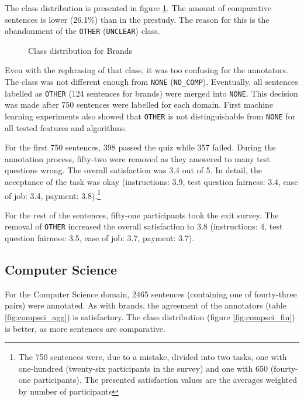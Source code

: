 The class distribution is presented in figure \ref{fig:brands_fin}. The amount of comparative sentences is lower (26.1\%) than in the prestudy. The reason for this is the abandonment of the \texttt{OTHER} (\texttt{UNCLEAR}) class. 

\begin{figure}[h]
\centering
\caption{Class distribution for Brands}
\label{fig:brands_fin}
\end{figure}



Even with the rephrasing of that class, it was too confusing for the annotators. The class was not different enough from \texttt{NONE} (\texttt{NO\_COMP}). Eventually, all sentences labelled as \texttt{OTHER} (124 sentences for brands) were merged into \texttt{NONE}. This decision was made after 750 sentences were labelled for each domain. First machine learning experiments also showed that \texttt{OTHER} is not distinguishable from \texttt{NONE} for all tested features and algorithms.

For the first 750 sentences, 398 passed the quiz while 357 failed. During the annotation process, fifty-two were removed as they answered to many test questions wrong. The overall satisfaction was 3.4 out of 5. In detail, the acceptance of the task was okay (instructions: 3.9, test question fairness: 3.4, ease of job: 3.4, payment: 3.8).\footnote{The 750 sentences were, due to a mistake, divided into two tasks, one with one-hundred (twenty-six participants in the survey) and one with 650 (fourty-one participants). The presented satisfaction values are the averages weighted by number of participants}

For the rest of the sentences, fifty-one participants took the exit survey. The removal of \texttt{OTHER} increased the overall satisfaction to 3.8 (instructions: 4, test question fairness: 3.5, ease of job: 3.7, payment: 3.7).


\subsection{Computer Science}

For the Computer Science domain, 2465 sentences (containing one of fourty-three pairs) were annotated. As with brands, the agreement of the annotators (table \ref{fig:compsci_agg}) is satisfactory. The class distribution (figure \ref{fig:compsci_fin}) is better, as more sentences are comparative.

